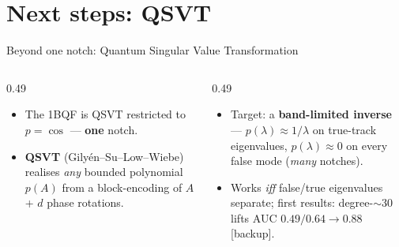 \section{Next steps: QSVT}
\begin{frame}{Beyond one notch: Quantum Singular Value Transformation}
  \begin{columns}[T]
    \begin{column}{0.49\textwidth}
      \begin{itemize}
        \item The 1BQF is QSVT restricted to $p=\cos$ --- \textbf{one} notch.
        \item \textbf{QSVT} (Gily\'en--Su--Low--Wiebe) realises \emph{any} bounded polynomial $p(A)$ from a block-encoding of $A$ + $d$ phase rotations.
      \end{itemize}
    \end{column}
    \begin{column}{0.49\textwidth}
      \begin{itemize}
        \item Target: a \textbf{band-limited inverse} --- $p(\lambda)\approx1/\lambda$ on true-track eigenvalues, $p(\lambda)\approx0$ on every false mode (\emph{many} notches).
        \item Works \emph{iff} false/true eigenvalues separate; first results: degree-$\sim$30 lifts AUC $0.49/0.64\to\mathbf{0.88}$ [backup].
      \end{itemize}
    \end{column}
  \end{columns}
  \vfill
  \centering{}
\end{frame}

